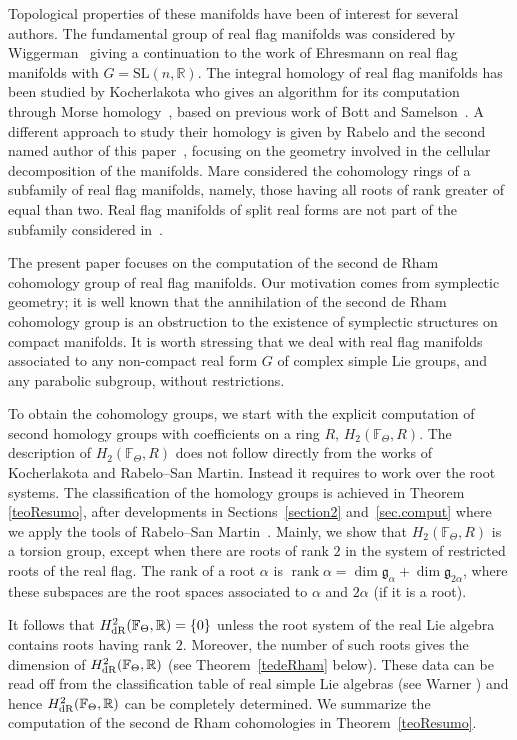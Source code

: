 \documentclass[pdftex]{sigma}
\numberwithin{equation}{section}
\begin{document}
Topological properties of these manifolds have been of interest for several authors. The fundamental group of real flag manifolds was considered by Wiggerman~\cite{Wi} giving a continuation to the work of Ehresmann on real flag manifolds with $G=\mathrm{SL}(n,\mathbb{R})$. The integral homology of real flag manifolds has been studied by Kocherlakota who gives an algorithm for its computation through Morse homology~\cite{Ko}, based on previous work of Bott and Samelson~\cite{BS}. A different approach to study their homology is given by Rabelo and the second named author of this paper~\cite{RSM}, focusing on the geometry involved in the cellular decomposition of the manifolds. Mare \cite{Ma} considered the cohomology rings of a subfamily of real flag manifolds, namely, those having all roots of rank greater of equal than two. Real flag manifolds of split real forms are not part of the subfamily considered in~\cite{Ma}.

The present paper focuses on the computation of the second de Rham cohomology group of real flag manifolds. Our motivation comes from symplectic geometry; it is well known that the annihilation of the second de Rham cohomology group is an obstruction to the existence of symplectic structures on compact manifolds. It is worth stressing that we deal with real flag manifolds associated to any non-compact real form $G$ of complex simple Lie groups, and any parabolic subgroup, without restrictions.

To obtain the cohomology groups, we start with the explicit computation of second homology groups with coefficients on a ring $R$, $H_{2}(\mathbb{F}_\Theta,R)$. The description of $H_{2}(\mathbb{F}_\Theta,R)$ does not follow directly from the works of Kocherlakota and Rabelo--San Martin. Instead it requires to work over the root systems. The classification of the homology groups is achieved in Theorem \ref{teoResumo}, after developments in Sections~\ref{section2} and~\ref{sec.comput} where we apply the tools of Rabelo--San Martin~\cite{RSM}. Mainly, we show that $H_{2}(\mathbb{F}_\Theta,R)$ is a torsion group, except when there are roots of rank $2$ in the system of restricted roots of the real flag. The rank of a root $\alpha $ is $\operatorname{rank} \alpha =\dim \mathfrak{g}_{\alpha }+\dim \mathfrak{g}_{2\alpha }$, where these subspaces are the root spaces associated to $\alpha$ and $2\alpha$ (if it is a root).

It follows that $H_{\rm dR}^{2}(\mathbb{F}_{\Theta },\mathbb{R})=\{0\}$ unless the root system of the real Lie algebra contains roots having rank $2$. Moreover, the number of such roots gives the dimension of $H_{\rm dR}^{2}(\mathbb{F}_{\Theta },\mathbb{R})$ (see Theorem~\ref{tedeRham} below). These data can be read off from the classification table of real simple Lie algebras (see Warner \cite[pp.~30--32]{WarG}) and hence $H_{\rm dR}^{2}(\mathbb{F}_{\Theta },\mathbb{R})$ can be completely determined. We summarize the computation of the second de Rham cohomologies in Theorem~\ref{teoResumo}.
\end{document}
